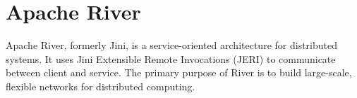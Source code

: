 \section{Apache River}

Apache River, \cite{www-hid-sp18-526-apache-river} formerly
Jini, is a service-oriented architecture for distributed
systems. It uses Jini Extensible Remote Invocations (JERI)
to communicate between client and service. The primary 
purpose of River is to build large-scale, flexible networks
for distributed computing.

